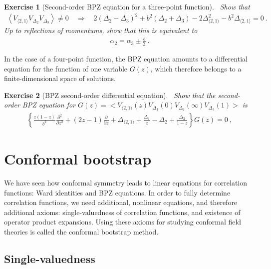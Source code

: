 \documentclass[12pt, a4paper]{article}
\theoremstyle{break}
\newtheorem{exo}{Exercise}[section]
\begin{document}
\begin{exo}[Second-order BPZ equation for a three-point function]
 ~\label{exo:bpz3pt}
 Show that 
\begin{align}
 \left< V_{\langle 2, 1 \rangle} V_{\Delta_2} V_{\Delta_3} \right> \neq 0 \quad \Rightarrow \quad 
 2(\Delta_2-\Delta_3)^2 +b^2(\Delta_2+\Delta_3) -2\Delta_{\langle 2, 1 \rangle}^2 -b^2\Delta_{\langle 2, 1 \rangle} = 0\ .
 \end{align}
 Up to reflections of momentums, show that this is equivalent to
 \begin{align}
 \alpha_2 = \alpha_3 \pm \frac{b}{2}\ .
 \label{eq:alpm}
\end{align}
\end{exo}

In the case of a four-point function, the BPZ equation amounts to a differential equation for the function of one variable $G(z)$, which therefore belongs to a finite-dimensional space of solutions.

\begin{exo}[BPZ second-order differential equation]
 ~\label{exo:bpz}
 Show that the second-order BPZ equation for $G(z)=\Big< V_{\langle 2, 1 \rangle}(z) V_{\Delta_1}(0)V_{\Delta_2}(\infty)V_{\Delta_3}(1) \Big>$ is
 \begin{align}
  \left\{ \frac{z(1-z)}{b^2}\frac{\partial^2}{\partial z^2} + (2z-1){\frac{\partial}{\partial z}} +\Delta_{\langle 2,1 \rangle} +\frac{\Delta_1}{z}-\Delta_2 + \frac{\Delta_3}{1-z}\right\} G(z)=0\ ,
\label{eq:ode}
 \end{align}
\end{exo}


\section{Conformal bootstrap}

We have seen how conformal symmetry leads to linear equations for correlation functions: Ward identities and BPZ equations. 
In order to fully determine correlation functions, we need additional, nonlinear equations, and therefore additional axioms: single-valuedness of correlation functions, and existence of operator product expansions. 
Using these axioms for studying conformal field theories is called the conformal bootstrap method. 

\subsection{Single-valuedness}\label{sec:sv}
\end{document}
